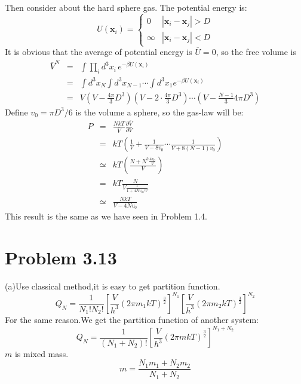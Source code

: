 \documentclass{article}
\begin{document}
	Then consider about the hard sphere gas. The potential energy is:
	$$
	U(\mathbf{x}_i)=\left\{\begin{array}{ll}
	0 &|\mathbf{x}_i-\mathbf{x}_j| > D\\
	\infty &|\mathbf{x}_i-\mathbf{x}_j| < D
	\end{array}\right.
	$$
	It is obvious that the average of potential energy is $\overline{U} = 0$, so the free volume is
	\begin{eqnarray}
	\overline{V}^N&=&\int \prod_i d^3x_i\,e^{-\beta U(\mathbf{x}_i)}\nonumber\\
	&=&\int d^3x_N\int d^3x_{N-1}\cdots \int d^3x_1 e^{-\beta U(\mathbf{x}_i)}\nonumber\\
	&=&V\left(V-\frac{4\pi}{3}D^3\right)\left(V-2\cdot\frac{4\pi}{3}D^3\right)\cdots\left(V-\frac{N-1}{3}4\pi D^3\right)
	\end{eqnarray}
	Define $v_0 = \pi D^3/6$ is the volume a sphere, so the gas-law will be:
	\begin{eqnarray}
	P &=& \frac{NkT}{\overline{V}}\frac{\partial \overline{V}}{\partial V}\nonumber\\
	&=& kT\left(\frac{1}{V}+\frac{1}{V-8v_0}\cdots \frac{1}{V+8(N-1)v_0}\right)\nonumber\\
	&\simeq & kT\left(\frac{N+N^2\frac{4v_0}{V}}{V}\right)\nonumber\\
	&=& kT\frac{N}{V\frac{1}{1+4Nv_0/V}}\nonumber\\
	&\simeq &\frac{NkT}{V-4Nv_0}
	\end{eqnarray}
	This result is the same as we have seen in Problem 1.4.

\section*{Problem 3.13} %
\label{sec:problem_3_13}
	(a)Use classical method,it is easy to get partition function.
	$$Q_N=\frac{1}{N_1!N_2!}[\frac{V}{h^3}(2\pi m_1kT)^\frac{3}{2}]^{N_1}[\frac{V}{h^3}(2\pi m_2kT)^\frac{3}{2}]^{N_2}$$
	For the same reason.We get the partition function of another system:
	$$Q_N=\frac{1}{(N_1+N_2)!}[\frac{V}{h^3}(2\pi mkT)^\frac{3}{2}]^{N_1+N_2}$$
	$m$ is mixed mass.
	$$m=\frac{N_1m_1+N_2m_2}{N_1+N_2}$$
\end{document}
